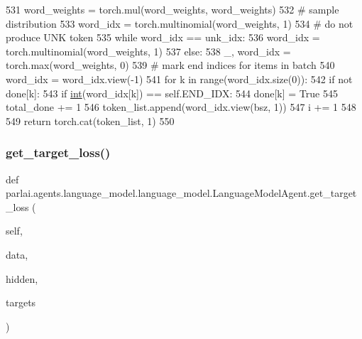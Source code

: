 \begin{DoxyCode}
531                     word\_weights = torch.mul(word\_weights, word\_weights)
532                     \textcolor{comment}{# sample distribution}
533                     word\_idx = torch.multinomial(word\_weights, 1)
534                     \textcolor{comment}{# do not produce UNK token}
535                     \textcolor{keywordflow}{while} word\_idx == unk\_idx:
536                         word\_idx = torch.multinomial(word\_weights, 1)
537                 \textcolor{keywordflow}{else}:
538                     \_, word\_idx = torch.max(word\_weights, 0)
539             \textcolor{comment}{# mark end indices for items in batch}
540             word\_idx = word\_idx.view(-1)
541             \textcolor{keywordflow}{for} k \textcolor{keywordflow}{in} range(word\_idx.size(0)):
542                 \textcolor{keywordflow}{if} \textcolor{keywordflow}{not} done[k]:
543                     \textcolor{keywordflow}{if} \hyperlink{namespacelanguage__model_1_1eval__ppl_a7d12ee00479673c5c8d1f6d01faa272a}{int}(word\_idx[k]) == self.END\_IDX:
544                         done[k] = \textcolor{keyword}{True}
545                         total\_done += 1
546             token\_list.append(word\_idx.view(bsz, 1))
547             i += 1
548 
549         \textcolor{keywordflow}{return} torch.cat(token\_list, 1)
550 
\end{DoxyCode}
\mbox{\label{classparlai_1_1agents_1_1language__model_1_1language__model_1_1LanguageModelAgent_aeb1136a4ae2a2a1e8c0d5a7b75d9898f}} 
\subsubsection{\texorpdfstring{get\+\_\+target\+\_\+loss()}{get\_target\_loss()}}
{\footnotesize\ttfamily def parlai.\+agents.\+language\+\_\+model.\+language\+\_\+model.\+Language\+Model\+Agent.\+get\+\_\+target\+\_\+loss (\begin{DoxyParamCaption}\item[{}]{self,  }\item[{}]{data,  }\item[{}]{hidden,  }\item[{}]{targets }\end{DoxyParamCaption})}

